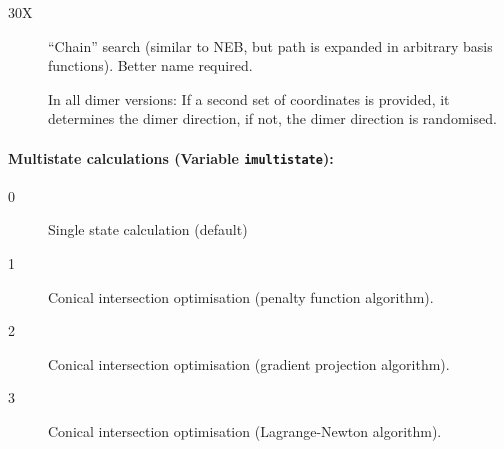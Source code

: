 \documentclass{article}
\begin{document}
\begin{description}
\item[30X] ``Chain'' search (similar to NEB, but path is expanded in arbitrary basis functions). Better name required.

  In all dimer versions: If a second set of coordinates is provided, it
  determines the dimer direction, if not, the dimer direction is randomised.
\end{description}

\paragraph{Multistate calculations (Variable \texttt{imultistate}):}
\begin{description}
\item[0] Single state calculation (default)
\item[1] Conical intersection optimisation (penalty function algorithm).
\item[2] Conical intersection optimisation (gradient projection algorithm).
\item[3] Conical intersection optimisation (Lagrange-Newton algorithm).
\end{description}
\end{document}

